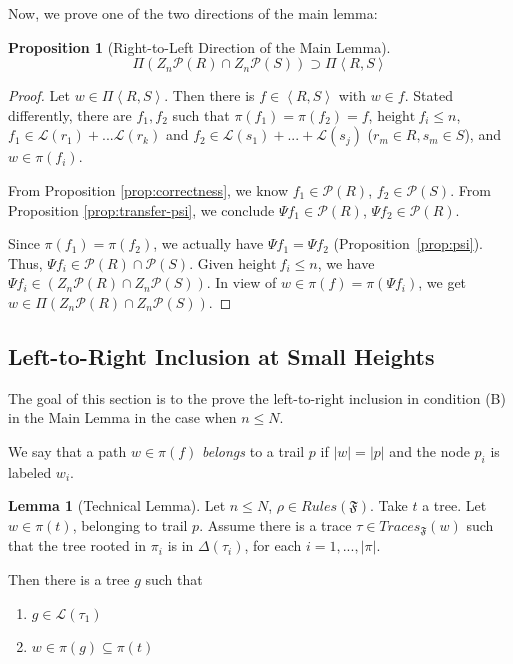 \documentclass[sigplan,9pt]{acmart}\settopmatter{printfolios=true,printccs=false,printacmref=false}
\newcounter{thm}
\newcounter{theorem}
\theoremstyle{definition}
\newtheorem{prop}[thm]{Proposition}
\newtheorem{llemma}[thm]{Lemma}
\newcommand{\La}[0]{{\mathcal{L}}}
\newcommand{\Ff}[0]{{\mathfrak{F}}}
\newcommand{\Pa}[0]{{\mathcal{P}}}
\newcommand{\Rn}[0]{Z_n}
\newcommand{\height}[0]{\text{height}}
\begin{document}
Now, we prove one of the two directions of the main lemma:

\begin{prop}[Right-to-Left Direction of the Main Lemma]\label{prop:one-direction}
\begin{equation}
\Pi \left(\Rn\Pa(R) \cap \Rn\Pa(S)\right) \supset \Pi\left\langle R, S\right\rangle 
\end{equation}
\end{prop}

\begin{proof}
Let $w \in \Pi \left\langle R, S\right\rangle$.
Then there is $f \in \left\langle R, S\right\rangle$ with $w \in f$.
Stated differently, there are $f_1, f_2$ such that $\pi(f_1) = \pi(f_2) = f$, $\height\ f_i \leq n$, $f_1 \in \La(r_1) + ... \La(r_k)$ and $f_2 \in \La(s_1) + ... + \La(s_j)$ ($r_m \in R, s_m \in S$), and $w \in \pi(f_i)$.

From Proposition \ref{prop:correctness}, we know $f_1 \in \Pa(R)$, $f_2 \in \Pa(S)$.
From Proposition \ref{prop:transfer-psi}, we conclude $\Psi f_1 \in \Pa(R)$, $\Psi f_2 \in \Pa(R)$.

Since $\pi(f_1) = \pi(f_2)$, we actually have $\Psi f_1 = \Psi f_2$ (Proposition~\ref{prop:psi}).
Thus, $\Psi f_i \in \Pa(R) \cap \Pa(S)$.
Given $\height\ f_i \leq n$, we have $\Psi f_i \in (\Rn\Pa(R) \cap \Rn\Pa(S))$.
In view of $w \in \pi(f) = \pi(\Psi f_i)$, we get $w \in \Pi (\Rn\Pa(R) \cap \Rn\Pa(S))$.
\end{proof}


\subsection{Left-to-Right Inclusion at Small Heights}

The goal of this section is to the prove the left-to-right inclusion in condition (B) in the Main Lemma in the case when $n \leq N$.

We say that a path $w \in \pi(f)$ \emph{belongs} to a trail $p$ if $|w|=|p|$ and the node $p_i$ is labeled $w_i$.

\begin{llemma}[Technical Lemma]\label{lemma:existsWitnessTree}
Let $n \leq N$, $\rho \in Rules(\Ff)$.
Take $t$ a tree.
Let $w \in \pi(t)$, belonging to trail $p$.
Assume there is a trace $\tau \in Traces_\Ff(w)$ such that the tree rooted in $\pi_i$ is in $\Delta(\tau_i)$, for each $i = 1, ..., |\pi|$.

Then there is a tree $g$ such that
\begin{enumerate}
\item $g \in \La(\tau_1)$
\item $w \in \pi(g) \subseteq \pi(t)$
\end{enumerate}
\end{llemma}
\end{document}
